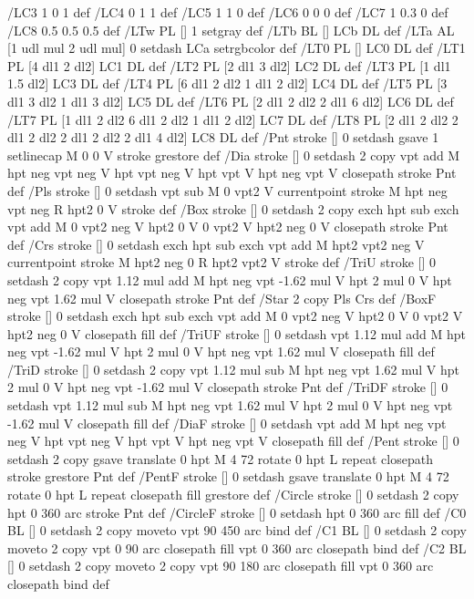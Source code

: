/LC3 {1 0 1} def
/LC4 {0 1 1} def
/LC5 {1 1 0} def
/LC6 {0 0 0} def
/LC7 {1 0.3 0} def
/LC8 {0.5 0.5 0.5} def
/LTw {PL [] 1 setgray} def
/LTb {BL [] LCb DL} def
/LTa {AL [1 udl mul 2 udl mul] 0 setdash LCa setrgbcolor} def
/LT0 {PL [] LC0 DL} def
/LT1 {PL [4 dl1 2 dl2] LC1 DL} def
/LT2 {PL [2 dl1 3 dl2] LC2 DL} def
/LT3 {PL [1 dl1 1.5 dl2] LC3 DL} def
/LT4 {PL [6 dl1 2 dl2 1 dl1 2 dl2] LC4 DL} def
/LT5 {PL [3 dl1 3 dl2 1 dl1 3 dl2] LC5 DL} def
/LT6 {PL [2 dl1 2 dl2 2 dl1 6 dl2] LC6 DL} def
/LT7 {PL [1 dl1 2 dl2 6 dl1 2 dl2 1 dl1 2 dl2] LC7 DL} def
/LT8 {PL [2 dl1 2 dl2 2 dl1 2 dl2 2 dl1 2 dl2 2 dl1 4 dl2] LC8 DL} def
/Pnt {stroke [] 0 setdash gsave 1 setlinecap M 0 0 V stroke grestore} def
/Dia {stroke [] 0 setdash 2 copy vpt add M
  hpt neg vpt neg V hpt vpt neg V
  hpt vpt V hpt neg vpt V closepath stroke
  Pnt} def
/Pls {stroke [] 0 setdash vpt sub M 0 vpt2 V
  currentpoint stroke M
  hpt neg vpt neg R hpt2 0 V stroke
 } def
/Box {stroke [] 0 setdash 2 copy exch hpt sub exch vpt add M
  0 vpt2 neg V hpt2 0 V 0 vpt2 V
  hpt2 neg 0 V closepath stroke
  Pnt} def
/Crs {stroke [] 0 setdash exch hpt sub exch vpt add M
  hpt2 vpt2 neg V currentpoint stroke M
  hpt2 neg 0 R hpt2 vpt2 V stroke} def
/TriU {stroke [] 0 setdash 2 copy vpt 1.12 mul add M
  hpt neg vpt -1.62 mul V
  hpt 2 mul 0 V
  hpt neg vpt 1.62 mul V closepath stroke
  Pnt} def
/Star {2 copy Pls Crs} def
/BoxF {stroke [] 0 setdash exch hpt sub exch vpt add M
  0 vpt2 neg V hpt2 0 V 0 vpt2 V
  hpt2 neg 0 V closepath fill} def
/TriUF {stroke [] 0 setdash vpt 1.12 mul add M
  hpt neg vpt -1.62 mul V
  hpt 2 mul 0 V
  hpt neg vpt 1.62 mul V closepath fill} def
/TriD {stroke [] 0 setdash 2 copy vpt 1.12 mul sub M
  hpt neg vpt 1.62 mul V
  hpt 2 mul 0 V
  hpt neg vpt -1.62 mul V closepath stroke
  Pnt} def
/TriDF {stroke [] 0 setdash vpt 1.12 mul sub M
  hpt neg vpt 1.62 mul V
  hpt 2 mul 0 V
  hpt neg vpt -1.62 mul V closepath fill} def
/DiaF {stroke [] 0 setdash vpt add M
  hpt neg vpt neg V hpt vpt neg V
  hpt vpt V hpt neg vpt V closepath fill} def
/Pent {stroke [] 0 setdash 2 copy gsave
  translate 0 hpt M 4 {72 rotate 0 hpt L} repeat
  closepath stroke grestore Pnt} def
/PentF {stroke [] 0 setdash gsave
  translate 0 hpt M 4 {72 rotate 0 hpt L} repeat
  closepath fill grestore} def
/Circle {stroke [] 0 setdash 2 copy
  hpt 0 360 arc stroke Pnt} def
/CircleF {stroke [] 0 setdash hpt 0 360 arc fill} def
/C0 {BL [] 0 setdash 2 copy moveto vpt 90 450 arc} bind def
/C1 {BL [] 0 setdash 2 copy moveto
	2 copy vpt 0 90 arc closepath fill
	vpt 0 360 arc closepath} bind def
/C2 {BL [] 0 setdash 2 copy moveto
	2 copy vpt 90 180 arc closepath fill
	vpt 0 360 arc closepath} bind def
